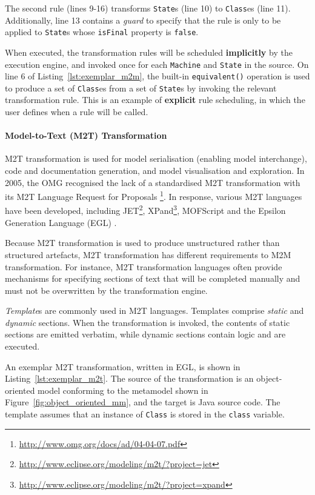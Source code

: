 The second rule (lines 9-16) transforms \texttt{State}s (line 10) to \texttt{Class}es (line 11). Additionally, line 13 contains a \emph{guard} to specify that the rule is only to be applied to \texttt{State}s whose \texttt{isFinal} property is \texttt{false}.

When executed, the transformation rules will be scheduled \textbf{implicitly} by the execution engine, and invoked once for each \texttt{Machine} and \texttt{State} in the source. On line 6 of Listing~\ref{lst:exemplar_m2m}, the built-in \texttt{equivalent()} operation is used to produce a set of \texttt{Class}es from a set of \texttt{State}s by invoking the relevant transformation rule. This is an example of \textbf{explicit} rule scheduling, in which the user defines when a rule will be called.


\paragraph{Model-to-Text (M2T) Transformation} M2T transformation is used for model serialisation (enabling model interchange), code and documentation generation, and model visualisation and exploration.  In 2005, the OMG \cite{omg} recognised the lack of a standardised M2T transformation with its M2T Language Request for Proposals \footnote{\url{http://www.omg.org/docs/ad/04-04-07.pdf}}. In response, various M2T languages have been developed, including JET\footnote{\url{http://www.eclipse.org/modeling/m2t/?project=jet}}, XPand\footnote{\url{http://www.eclipse.org/modeling/m2t/?project=xpand}}, MOFScript \cite{oldevik05toward} and the Epsilon Generation Language (EGL) \cite{rose08egl}.

Because M2T transformation is used to produce unstructured rather than structured artefacts, M2T transformation has different requirements to M2M transformation. For instance, M2T transformation languages often provide mechanisms for specifying sections of text that will be completed manually and must not be overwritten by the transformation engine.

\emph{Template}s are commonly used in M2T languages. Templates comprise \emph{static} and \emph{dynamic} sections. When the transformation is invoked, the contents of static sections are emitted verbatim, while dynamic sections contain logic and are executed.

An exemplar M2T transformation, written in EGL, is shown in Listing~\ref{lst:exemplar_m2t}. The source of the transformation is an object-oriented model conforming to the metamodel shown in Figure~\ref{fig:object_oriented_mm}, and the target is Java source code. The template assumes that an instance of \texttt{Class} is stored in the \texttt{class} variable.

